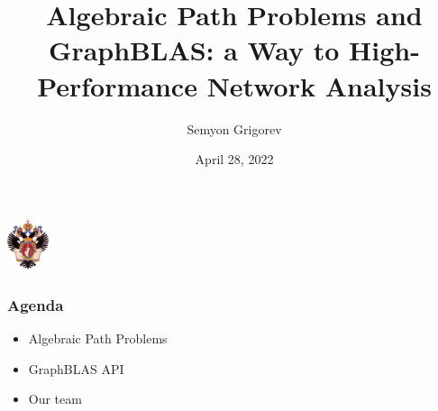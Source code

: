 \documentclass[xcolor=table,aspectratio=169]{beamer}
\title[Algebraic Path Problems \& GraphBLAS]{Algebraic Path Problems and GraphBLAS: a Way to High-Performance Network Analysis}
\institute[PL\&T@SPbSU]{
Saint Petersburg State University
}
\author[Semyon Grigorev]{Semyon Grigorev}
\date{April 28, 2022}
\begin{document}
{
\begin{frame}[fragile]
  \begin{table}
  \centering
  \includegraphics[height=1.5cm]{pictures/SPbGU_Logo.png}
  \end{table}
  \titlepage
\end{frame}
}

\begin{frame}[fragile]
  \frametitle{Agenda}  
  \begin{itemize}
    \item Algebraic Path Problems
    \item GraphBLAS API
    \item Our team
  \end{itemize}
\end{frame}
\end{document}
